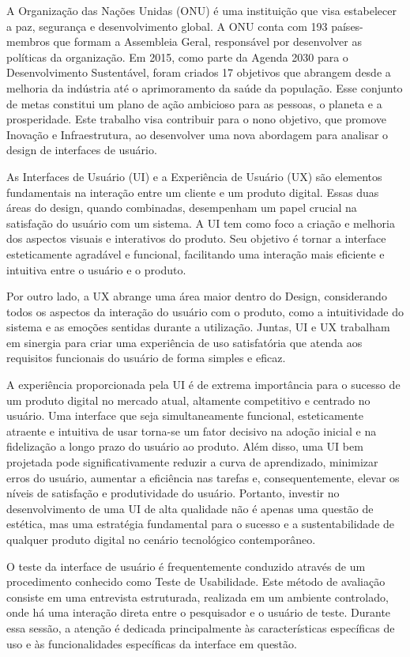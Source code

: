 A Organização das Nações Unidas (ONU) é uma instituição que visa estabelecer a paz, segurança e desenvolvimento global. A ONU conta com 193 países-membros que formam a Assembleia Geral, responsável por desenvolver as políticas da organização. Em 2015, como parte da Agenda 2030 para o Desenvolvimento Sustentável, foram criados 17 objetivos que abrangem desde a melhoria da indústria até o aprimoramento da saúde da população. Esse conjunto de metas constitui um plano de ação ambicioso para as pessoas, o planeta e a prosperidade. Este trabalho visa contribuir para o nono objetivo, que promove Inovação e Infraestrutura, ao desenvolver uma nova abordagem para analisar o design de interfaces de usuário.
\textcite{ODS2024}

As Interfaces de Usuário (UI) e a Experiência de Usuário (UX) são elementos fundamentais na interação entre um cliente e um produto digital. Essas duas áreas do design, quando combinadas, desempenham um papel crucial na satisfação do usuário com um sistema. A UI tem como foco a criação e melhoria dos aspectos visuais e interativos do produto. Seu objetivo é tornar a interface esteticamente agradável e funcional, facilitando uma interação mais eficiente e intuitiva entre o usuário e o produto.

Por outro lado, a UX abrange uma área maior dentro do Design, considerando todos os aspectos da interação do usuário com o produto, como a intuitividade do sistema e as emoções sentidas durante a utilização. Juntas, UI e UX trabalham em sinergia para criar uma experiência de uso satisfatória que atenda aos requisitos funcionais do usuário de forma simples e eficaz. 
\textcite{EBAC}

A experiência proporcionada pela UI é de extrema importância para o sucesso de um produto digital no mercado atual, altamente competitivo e centrado no usuário. Uma interface que seja simultaneamente funcional, esteticamente atraente e intuitiva de usar torna-se um fator decisivo na adoção inicial e na fidelização a longo prazo do usuário ao produto. Além disso, uma UI bem projetada pode significativamente reduzir a curva de aprendizado, minimizar erros do usuário, aumentar a eficiência nas tarefas e, consequentemente, elevar os níveis de satisfação e produtividade do usuário. Portanto, investir no desenvolvimento de uma UI de alta qualidade não é apenas uma questão de estética, mas uma estratégia fundamental para o sucesso e a sustentabilidade de qualquer produto digital no cenário tecnológico contemporâneo.

O teste da interface de usuário é frequentemente conduzido através de um procedimento conhecido como Teste de Usabilidade. Este método de avaliação consiste em uma entrevista estruturada, realizada em um ambiente controlado, onde há uma interação direta entre o pesquisador e o usuário de teste. Durante essa sessão, a atenção é dedicada principalmente às características específicas de uso e às funcionalidades específicas da interface em questão.

